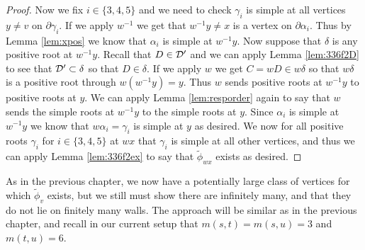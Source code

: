 \documentclass[class=book, crop=false]{standalone}
\begin{document}
\begin{proof}
Now we fix $i\in \{3,4,5\}$ and we need to check $\gamma_i$ is simple at all vertices $y\neq v$ on $\partial\gamma_i.$ If we apply $w^{-1}$ we get that $w^{-1}y\neq x$ is a vertex on $\partial \alpha_i.$ Thus by Lemma \ref{lem:xpos} we know that $\alpha_i$ is simple at $w^{-1}y.$ Now suppose that $\delta$ is any positive root at $w^{-1}y.$ Recall that $D\in \mathcal{D}'$ and we can apply Lemma \ref{lem:336f2D} to see that $\mathcal{D}'\subset \delta$ so that $D\in \delta.$ If we apply $w$ we get $C=wD\in w\delta$ so that $w\delta$ is a positive root through $w(w^{-1}y)=y.$ Thus $w$ sends positive roots at $w^{-1}y$ to positive roots at $y.$ We can apply Lemma \ref{lem:resporder} again to say that $w$ sends the simple roots at $w^{-1}y$ to the simple roots at $y.$ Since $\alpha_i$ is simple at $w^{-1}y$ we know that $w\alpha_i=\gamma_i$ is simple at $y$ as desired. We now for all positive roots $\gamma_i$ for $i\in \{3,4,5\}$ at $wx$ that $\gamma_i$ is simple at all other vertices, and thus we can apply Lemma \ref{lem:336f2ex} to say that $\tilde{\phi}_{wx}$ exists as desired.


\end{proof}

As in the previous chapter, we now have a potentially large class of vertices for which $\tilde{\phi}_v$ exists, but we still must show there are infinitely many, and that they do not lie on finitely many walls. The approach will be similar as in the previous chapter, and recall in our current setup that $m(s,t)=m(s,u)=3$ and $m(t,u)=6.$
\end{document}
